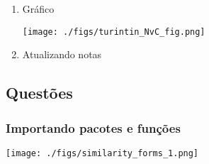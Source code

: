 \documentclass[11pt]{article}
\begin{document}
\begin{enumerate}
\item Gráfico
\label{sec:org749c03f}
\begin{center}
\texttt{[image: ./figs/turintin\_NvC\_fig.png]}
\end{center}

\item Atualizando notas
\label{sec:org188f4bb}
\end{enumerate}

\subsection{Questões}
\label{sec:orgbe6801c}


\subsubsection{Importando pacotes e funções}
\label{sec:org8204940}

\begin{center}
\texttt{[image: ./figs/similarity\_forms\_1.png]}
\end{center}
\end{document}
